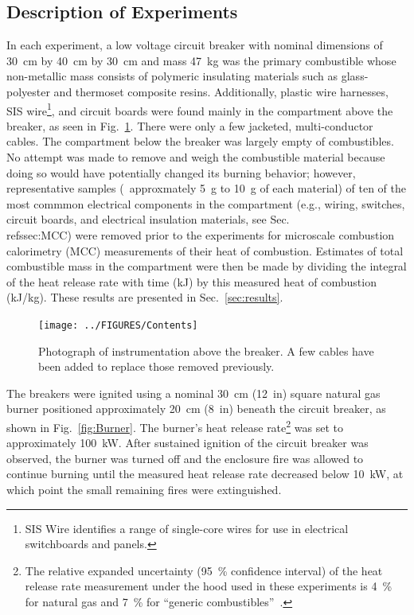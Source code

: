 \subsection{Description of Experiments}

In each experiment, a low voltage circuit breaker with nominal dimensions of 30~cm by 40~cm by 30~cm and mass 47~kg was the primary combustible whose non-metallic mass consists of polymeric insulating materials such as glass-polyester and thermoset composite resins. Additionally, plastic wire harnesses, SIS wire\footnote{SIS Wire identifies a range of single-core wires for use in electrical switchboards and panels.}, and circuit boards were found mainly in the compartment above the breaker, as seen in Fig.~\ref{fig:Contents}. There were only a few jacketed, multi-conductor cables. The compartment below the breaker was largely empty of combustibles. No attempt was made to remove and weigh the combustible material because doing so would have potentially changed its burning behavior; however, representative samples (~approxmately 5~g to 10~g of each material) of ten of the most commmon electrical components in the compartment (e.g., wiring, switches, circuit boards, and electrical insulation materials, see Sec.~\\ref{ssec:MCC}) were removed prior to the experiments for microscale combustion calorimetry (MCC) measurements of their heat of combustion. Estimates of total combustible mass in the compartment were then be made by dividing the integral of the heat release rate with time (kJ) by this measured heat of combustion (kJ/kg). These results are presented in Sec.~\ref{sec:results}.

\begin{figure}[ht]
\centering
\texttt{[image: ../FIGURES/Contents]}
\caption[Photograph of instrumentation above the breaker] {Photograph of instrumentation above the breaker. A few cables have been added to replace those removed previously.}
\label{fig:Contents}
\end{figure}

The breakers were ignited using a nominal 30~cm (12~in) square natural gas burner positioned approximately 20~cm (8~in) beneath the circuit breaker, as shown in Fig.~\ref{fig:Burner}. The burner's heat release rate\footnote{The relative expanded uncertainty (95~\% confidence interval) of the heat release rate measurement under the hood used in these experiments is 4~\% for natural gas and 7~\% for ``generic combustibles''~\cite{bryant2019nist}.} was set to approximately 100~kW. After sustained ignition of the circuit breaker was observed, the burner was turned off and the enclosure fire was allowed to continue burning until the measured heat release rate decreased below 10~kW, at which point the small remaining fires were extinguished.

